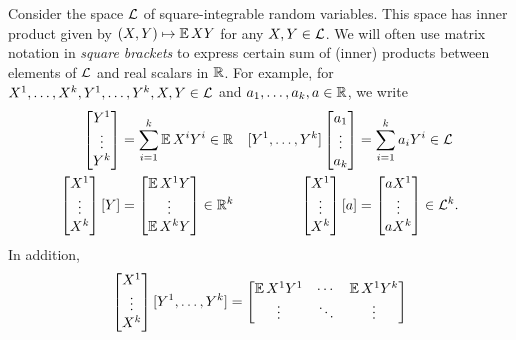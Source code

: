 \documentclass[main.tex]{subfiles}
\begin{document}
\begin{defn}
\label{defn:LsqZ}
Consider the space $\mathcal{L}$ of square-integrable random variables.
This space has inner product given by $(X, Y) \mapsto \operatorname*{\mathbb{E}} XY$ for any $X, Y \in \mathcal{L}$.
We will often use matrix notation in \emph{square brackets} to express certain sum of (inner) products between elements of $\mathcal{L}$ and real scalars in $\mathbb{R}$.
For example, for $X^1, \ldots, X^k, Y^1, \ldots, Y^k, X, Y \in \mathcal{L}$ and $a_1, \ldots, a_k, a \in \mathbb{R}$, we write
\begin{align*}
[X^1, \ldots, X^k]
\begin{bmatrix}
Y^1\\
\vdots\\
Y^k
\end{bmatrix}
  &=
    \sum_{i=1}^k \EV X^i Y^i
      \in \R
    &
[Y^1, \ldots, Y^k]
\begin{bmatrix}
a_1\\
\vdots\\
a_k
\end{bmatrix}
  &=
    \sum_{i=1}^k a_i Y^i \in \LsqZ
    \\
\begin{bmatrix}
X^1\\
\vdots\\
X^k
\end{bmatrix}
[Y]
  &=
    \begin{bmatrix}
    \EV X^1 Y\\
    \vdots\\
    \EV X^k Y
    \end{bmatrix}
      \in \R^{k}
    &
\begin{bmatrix}
X^1\\
\vdots\\
X^k
\end{bmatrix}
[a]
  &=
    \begin{bmatrix}
    aX^1\\
    \vdots\\
    aX^k
    \end{bmatrix}
    \in \LsqZ^k.
\end{align*}
In addition,
\begin{align*}
  \begin{bmatrix}
  X^1\\
  \vdots\\
  X^k
  \end{bmatrix}
  [Y^1, \ldots, Y^k]
  =
  \begin{bmatrix}
    \operatorname*{\mathbb{E}} X^1 Y^1 & \cdots & \operatorname*{\mathbb{E}} X^1 Y^k\\
    \vdots & \ddots & \vdots\\

\end{bmatrix}
\end{align*}
\end{defn}
\end{document}
